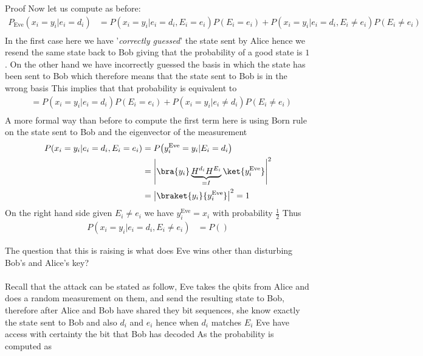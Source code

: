 \begin{parag}{Proof}
    Now let us compute as before:
	\begin{align*} 
		P_{\text{Eve}}\left(x_i = y_i | e_i = d_i\right) &= P\left(x_i = y_i | e_i = d_i, E_i = e_i\right)P\left(E_i = e_i\right) + P\left(x_i = y_i| e_i = d_i, E_i \neq e_i\right) P\left(E_i \neq e_i\right)\\
	\end{align*}
	In the first case here we have '\textit{correctly guessed}' the state sent by Alice hence we resend the same state back to Bob giving that the probability of a good state is $1$. On the other hand we have incorrectly guessed the basis in which the state has been sent to Bob which therefore means that the state sent to Bob is in the wrong basis This implies that that probability is equivalent to 
	\begin{align*} 
		&= P\left(x_i = y_i| e_i = d_i\right) P\left(E_i = e_i\right) + P\left(x_i = y_i| e_i \neq d_i\right) P\left(E_i \neq e_i\right)\\
	\end{align*}
	A more formal way than before to compute the first term here is using Born rule on the state sent to Bob and the eigenvector of the measurement 
	\begin{align*} 
		P\left(x_i = y_i| e_i = d_i, E_i = e_i\right) &=  P\left(y_i^{\text{Eve}} = y_i | E_i = d_i\right)\\&= \left|\bra{y_i}\underbrace{H^{d_i}H^{E_i}}_{= I}\ket{y_i^{\text{Eve}}}\right|^2\\
													  &= \left|\braket{y_i}{y_i^{\text{Eve}}}\right|^2 = 1
	\end{align*}
	On the right hand side given $E_i \neq e_i$ we have $y_i^{\text{Eve}}= x_i$ with probability $\frac{1}{2}$ Thus 
	\begin{align*} 
		P\left(x_i = y_i |e_i = d_i, E_i \neq e_i\right) &= P\left(\right) 
	\end{align*}
\end{parag}
The question that this is raising is what does Eve wins other than disturbing Bob's and Alice's key?\\
$ $\\
Recall that the attack can be stated as follow, Eve takes the qbits from Alice and does a random measurement on them, and send the resulting state to Bob, therefore after Alice and Bob have shared they bit sequences, she know exactly the state sent to Bob and also $d_i$ and $e_i$ hence when $d_i$ matches $E_i$ Eve have access with certainty the bit that Bob has decoded As the probability is computed as 
